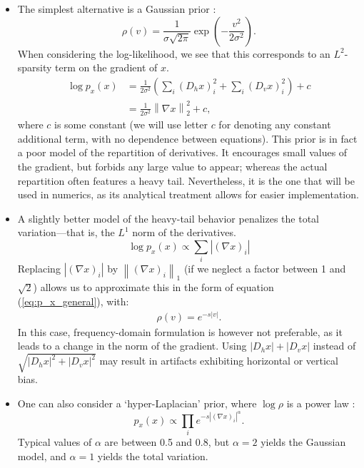 \documentclass[english,a4paper]{article}
\theoremstyle{plain}
\theoremstyle{definition}
\theoremstyle{remark}
\newcommand{\norm}[1]{\left\lVert #1 \right\rVert}
\begin{document}
\begin{itemize}
	\item The simplest alternative is a Gaussian prior \cite{levin2011efficient}:
	\begin{equation}\label{eq:rho_gaussian}
	\rho(v) = \frac{1}{\sigma \sqrt{2\pi}} \exp\left( -\frac{v^2}{2\sigma^2} \right) .
	\end{equation}
	When considering the log-likelihood, we see that this corresponds to an $L^2$-sparsity term on the gradient of $x$.
	\begin{align*}
	\log p_x(x) & = \frac{1}{2\sigma^2} \left( 
	\sum_i (D_h x)_i^2 
	+ \sum_i (D_v x)_i^2
	\right) + c\\
	& = \frac{1}{2\sigma^2} \norm{\nabla x}_2^2 +c ,
	\end{align*}
	where $c$ is some constant (we will use letter $c$ for denoting any constant additional term, with no dependence between equations).
	This prior is in fact a poor model of the repartition of derivatives. It encourages small values of the gradient, but forbids any large value to appear; whereas the actual repartition often features a heavy tail.
	Nevertheless, it is the one that will be used in numerics, as its analytical treatment allows for easier implementation.
	\item A slightly better model of the heavy-tail behavior penalizes the total variation---that is, the $L^1$ norm of the derivatives.
	\begin{equation}\label{eq:TV}
	\log p_x(x) \propto \sum_i |(\nabla x)_i|
	\end{equation}
	Replacing $|(\nabla x)_i|$ by $\norm{(\nabla x)_i}_1$ (if we neglect a factor between 1 and $\sqrt{2}$) allows us to approximate this in the form of equation (\ref{eq:p_x_general}), with:
	\begin{align*}
	\rho(v) = e^{-s|v|} .
	\end{align*}
	In this case, frequency-domain formulation is however not preferable, as it leads to a change in the norm of the gradient. Using $|D_h x| + |D_v x|$ instead of $\sqrt{|D_h x|^2 + |D_v x|^2}$ may result in artifacts exhibiting horizontal or vertical bias.
	\item One can also consider a `hyper-Laplacian' prior, where $\log \rho$ is a power law \cite{krishnan2009fast, levin2009understanding}:
	\begin{equation}\label{eq:p_hyper_laplacian}
	p_x(x) \propto \prod_i e^{-s|(\nabla x)_i|^\alpha}.
	\end{equation}
	Typical values of $\alpha$ are between 0.5 and 0.8, but $\alpha=2$ yields the Gaussian model, and $\alpha=1$ yields the total variation.

\end{itemize}
\end{document}
